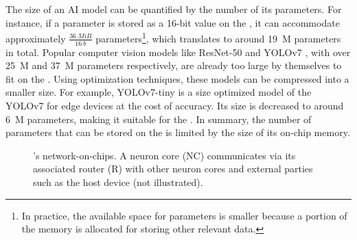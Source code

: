 The size of an AI model can be quantified by the number of its parameters.
For instance, if a parameter is stored as a 16-bit value on the \graicore{}, it can accommodate approximately $\frac{\SI{36}{MiB}}{\SI{16}{b}}$ parameters\footnote{In practice, the available space for parameters is smaller because a portion of the memory is allocated for storing other relevant data.}, which translates to around \SI{19}{M} parameters in total.
Popular computer vision models like ResNet-50 \cite{heDeepResidualLearning2015} and YOLOv7 \cite{wangYOLOv7TrainableBagoffreebies2022}, with over \SI{25}{M} and \SI{37}{M} parameters respectively, are already too large by themselves to fit on the \graicore{}.
Using optimization techniques, these models can be compressed into a smaller size.
For example, YOLOv7-tiny \cite{wangYOLOv7TrainableBagoffreebies2022} is a size optimized model of the YOLOv7 for edge devices at the cost of accuracy.
Its size is decreased to around \SI{6}{M} parameters, making it suitable for the \graicore{}.
In summary, the number of parameters that can be stored on the \graicore{} is limited by the size of its on-chip memory.

\begin{figure}[htbp]
    \centering
    \hfill
    \caption{\graicore{}'s network-on-chips. A neuron core (NC) communicates via its associated router (R) with other neuron cores and external parties such as the host device (not illustrated).}
    \label{fig:noc}
\end{figure}

